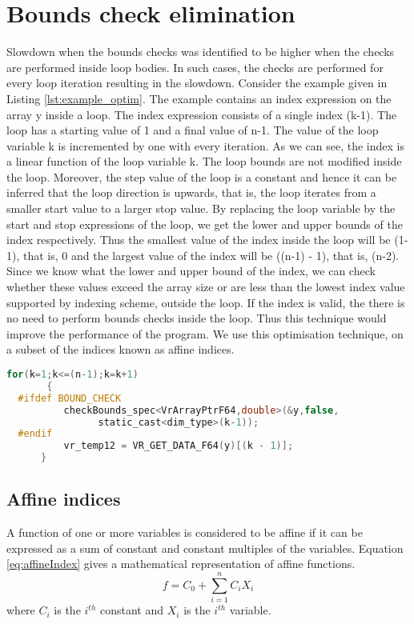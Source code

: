 \section{Bounds check elimination}
Slowdown when the bounds checks was identified to be higher when the checks are performed inside loop bodies. In such cases, the checks are performed for every loop iteration resulting in the slowdown. Consider the example given in Listing \ref{lst:example_optim}. The example contains an index expression on the array y inside a loop. The index expression consists of a single index (k-1). The loop has a starting value of 1 and a final value of n-1. The value of the loop variable k is incremented by one with every iteration. As we can see, the index is a linear function of the loop variable k. The loop bounds are not modified inside the loop. Moreover, the step value of the loop is a constant and hence it can be inferred that the loop direction is upwards, that is, the loop iterates from a smaller start value to a larger stop value. By replacing the loop variable by the start and stop expressions of the loop, we get the lower and upper bounds of the index respectively. Thus the smallest value of the index inside the loop will be (1-1), that is, 0 and the largest value of the index will be ((n-1) - 1), that is, (n-2). Since we know what the lower and upper bound of the index, we can check whether these values exceed the array size or are less than the lowest index value supported by indexing scheme, outside the loop. If the index is valid, the there is no need to perform bounds checks inside the loop. Thus this technique would improve the performance of the program. We use this optimisation technique, on a subset of the indices known as affine indices. 
\begin{lstlisting}[float,language=c,caption={Example C++ for loop with array index expressions},label={lst:example_optim}]
   for(k=1;k<=(n-1);k=k+1)
       {
  #ifdef BOUND_CHECK
          checkBounds_spec<VrArrayPtrF64,double>(&y,false,
				static_cast<dim_type>(k-1));
  #endif
          vr_temp12 = VR_GET_DATA_F64(y)[(k - 1)];
      }
\end{lstlisting}
\subsection{Affine indices}
A function of one or more variables is considered to be affine if it can be expressed as a sum of constant and constant multiples of the variables. Equation \ref{eq:affineIndex} gives a mathematical representation of affine functions. 
\begin{equation}
\label{eq:affineIndex}
f = C_0 + \sum\limits_{i=1}^n C_iX_i 
\end{equation}
where $C_i$ is the $i^{th}$ constant and $X_i$ is the $i^{th}$ variable. 

